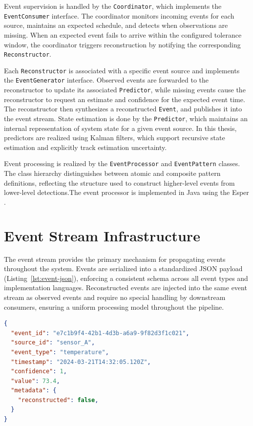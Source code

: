 Event supervision is handled by the \texttt{Coordinator}, which implements the \texttt{EventConsumer} interface. The coordinator monitors incoming events for each source, maintains an expected schedule, and detects when observations are missing. When an expected event fails to arrive within the configured tolerance window, the coordinator triggers reconstruction by notifying the corresponding \texttt{Reconstructor}.

Each \texttt{Reconstructor} is associated with a specific event source and implements the \texttt{EventGenerator} interface. Observed events are forwarded to the reconstructor to update its associated \texttt{Predictor}, while missing events cause the reconstructor to request an estimate and confidence for the expected event time. The reconstructor then synthesizes a reconstructed \texttt{Event}, and publishes it into the event stream. State estimation is done by the \texttt{Predictor}, which maintains an internal representation of system state for a given event source. In this thesis, predictors are realized using Kalman filters, which support recursive state estimation and explicitly track estimation uncertainty.

Event processing is realized by the \texttt{EventProcessor} and \texttt{EventPattern} classes. The class hierarchy distinguishes between atomic and composite pattern definitions, reflecting the structure used to construct higher-level events from lower-level detections.The event processor is implemented in Java using the Esper \cite{esper_reference}.



\section{Event Stream Infrastructure}
The event stream provides the primary mechanism for propagating events throughout the system. Events are serialized into a standardized JSON payload (Listing~\ref{lst:event-json}), enforcing a consistent schema across all event types and implementation languages. Reconstructed events are injected into the same event stream as observed events and require no special handling by downstream consumers, ensuring a uniform processing model throughout the pipeline.

\begin{lstlisting}[language=json, caption={Example standardized event payload}, label={lst:event-json}]
{
  "event_id": "e7c1b9f4-42b1-4d3b-a6a9-9f82d3f1c021",
  "source_id": "sensor_A",
  "event_type": "temperature",
  "timestamp": "2024-03-21T14:32:05.120Z",
  "confidence": 1,
  "value": 73.4,
  "metadata": {
    "reconstructed": false,
  }
}
\end{lstlisting}

